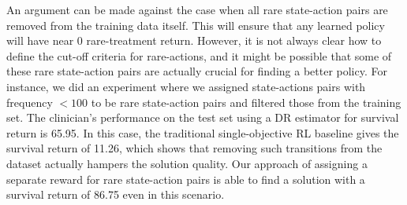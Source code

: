 An argument can be made against the case when all rare state-action pairs are removed from the training data itself. This will ensure that any learned policy will have near 0 rare-treatment return. However, it is not always clear how to define the cut-off criteria for rare-actions, and it might be possible that some of these rare state-action pairs are actually crucial for finding a better policy. 
For instance, we did an experiment where we assigned state-actions pairs with frequency $<100$ to be rare state-action pairs and filtered those from the training set. The clinician's performance on the test set using a DR estimator for survival return is 65.95. %
In this case, the traditional single-objective RL baseline gives the survival return of 11.26, %
which shows that removing such transitions from the dataset actually hampers the solution quality. Our approach of assigning a separate reward for rare state-action pairs is able to find a solution with a survival return of 86.75 %
even in this scenario.




